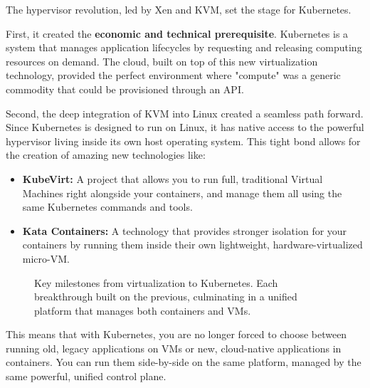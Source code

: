 The hypervisor revolution, led by Xen and KVM, set the stage for Kubernetes.

First, it created the \textbf{economic and technical prerequisite}. Kubernetes is a system that manages application lifecycles by requesting and releasing computing resources on demand. The cloud, built on top of this new virtualization technology, provided the perfect environment where "compute" was a generic commodity that could be provisioned through an API.

Second, the deep integration of KVM into Linux created a seamless path forward. Since Kubernetes is designed to run on Linux, it has native access to the powerful hypervisor living inside its own host operating system. This tight bond allows for the creation of amazing new technologies like:

\begin{itemize}
\item \textbf{KubeVirt:} A project that allows you to run full, traditional Virtual Machines right alongside your containers, and manage them all using the same Kubernetes commands and tools.
\item \textbf{Kata Containers:} A technology that provides stronger isolation for your containers by running them inside their own lightweight, hardware-virtualized micro-VM.
\end{itemize}
\begin{figure}[htbp]
\centering

\caption{Key milestones from virtualization to Kubernetes. Each breakthrough built on the previous, culminating in a unified platform that manages both containers and VMs.}
\label{fig:3_4}
\end{figure}



This means that with Kubernetes, you are no longer forced to choose between running old, legacy applications on VMs or new, cloud-native applications in containers. You can run them side-by-side on the same platform, managed by the same powerful, unified control plane.
